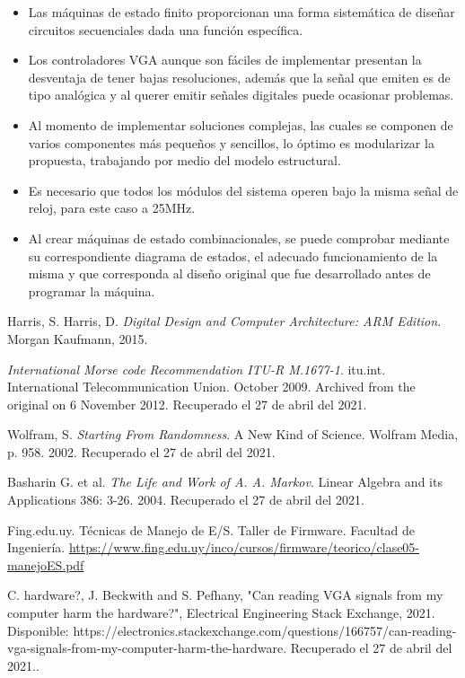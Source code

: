 \documentclass[journal,trans]{IEEEtran}
\begin{document}
	\begin{itemize}
		\item Las máquinas de estado finito proporcionan una forma sistemática de diseñar circuitos secuenciales dada una función específica. 
		
		\item Los controladores VGA aunque son fáciles de implementar presentan la desventaja de tener bajas resoluciones, además que la señal que emiten es de tipo analógica y al querer emitir señales digitales puede ocasionar problemas.
		
		\item Al momento de implementar soluciones complejas, las cuales se componen de varios componentes más pequeños y sencillos, lo óptimo es modularizar la propuesta, trabajando por medio del modelo estructural.
		
		\item Es necesario que todos los módulos del sistema operen bajo la misma señal de reloj, para este caso a 25MHz.
		
		\item Al crear máquinas de estado combinacionales, se puede comprobar mediante su correspondiente diagrama de estados, el adecuado funcionamiento de la misma y que corresponda al diseño original que fue desarrollado antes de programar la máquina.
		
		
	\end{itemize}
	
	
	\begin{thebibliography}{1}
		
		
		Harris, S. Harris, D. \emph{Digital Design and Computer Architecture: ARM Edition}. Morgan Kaufmann, 2015.
		
		\emph{International Morse code Recommendation ITU-R M.1677-1}. itu.int. International Telecommunication Union. October 2009. Archived from the original on 6 November 2012. Recuperado el 27 de abril del 2021.
		
		Wolfram, S. \emph{Starting From Randomness}. A New Kind of Science. Wolfram Media, p. 958. 2002. Recuperado el 27 de abril del 2021.
		
		Basharin G. et al. \emph{The Life and Work of A. A. Markov}. Linear Algebra and its Applications 386: 3-26. 2004. Recuperado el 27 de abril del 2021.
		
		Fing.edu.uy. T\'ecnicas de Manejo de E/S. Taller de Firmware. Facultad de Ingenier\'ia.
		\url{https://www.fing.edu.uy/inco/cursos/firmware/teorico/clase05-manejoES.pdf}
		
		C. hardware?, J. Beckwith and S. Pefhany, "Can reading VGA signals from my computer harm the hardware?", Electrical Engineering Stack Exchange, 2021. Disponible: https://electronics.stackexchange.com/questions/166757/can-reading-vga-signals-from-my-computer-harm-the-hardware. Recuperado el 27 de abril del 2021..
		
	\end{thebibliography}
\end{document}
